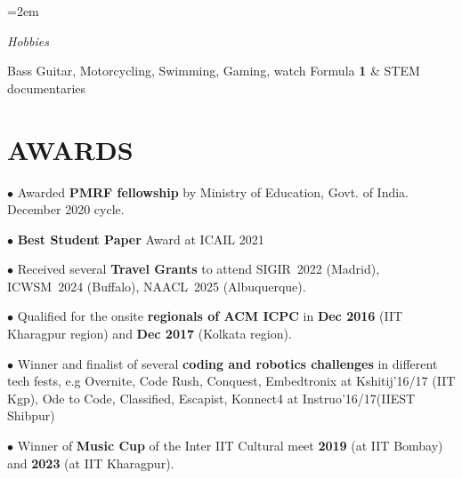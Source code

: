 \documentclass[paper=a4,fontsize=10pt]{scrartcl} %
\newlength{\spacebox}
\newcommand{\sepspace}{\vspace*{0.6em}}		%
\newcommand{\NewPart}[1]{\section*{\uppercase{#1}}}
\newcommand{\PersonalEntry}[2]{
		\noindent\hangindent=2em\hangafter=0 %
		\parbox{\spacebox}{        %
		\textit{#1}}		       %
		\hspace{1.5em} #2 \par}    %
\newcommand{\SkillsEntry}[2]{      %
		\noindent\hangindent=2em\hangafter=0 %
		\parbox{\spacebox}{        %
		\textit{#1}}			   %
		\hspace{1.5em} #2 \par}    %
\begin{document}


\SkillsEntry{Hobbies}{Bass Guitar, Motorcycling, Swimming, Gaming, watch Formula \textbf{1} \& STEM documentaries}


\vspace*{-1mm}



\NewPart{Awards}{}

{
\small
    
    
    
    
    \noindent $\bullet$ Awarded \textbf{PMRF fellowship} by Ministry of Education, Govt. of India. December 2020 cycle. 
    
    \noindent $\bullet$ \textbf{Best Student Paper} Award at ICAIL 2021 
    \sepspace

    \noindent $\bullet$ Received several \textbf{Travel Grants} to attend  SIGIR~2022 (Madrid), ICWSM~2024 (Buffalo), NAACL~2025 (Albuquerque). 
    
    \noindent $\bullet$ Qualified for the onsite \textbf{regionals of ACM ICPC} in \textbf{Dec 2016} (IIT Kharagpur region) and \textbf{Dec 2017} (Kolkata region). 
    \sepspace
    
    \noindent $\bullet$ Winner and finalist of several \textbf{coding and robotics challenges} in different tech fests, e.g Overnite, Code Rush, Conquest, Embedtronix at Kshitij'16/17 (IIT Kgp), 
    Ode to Code, Classified, Escapist, Konnect4 at Instruo'16/17(IIEST Shibpur) 
    
    \noindent $\bullet$ Winner of \textbf{Music Cup} of the Inter IIT Cultural meet \textbf{2019} (at IIT Bombay) and \textbf{2023} (at IIT Kharagpur). 
}




\vspace*{-1mm}
\end{document}
